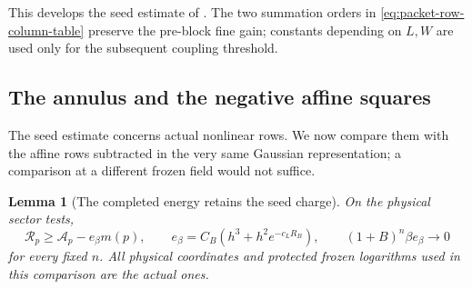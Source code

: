 \documentclass[11pt,reqno]{amsart}
\numberwithin{equation}{section}
\newtheorem{lemma}[theorem]{Lemma}
\theoremstyle{definition}
\theoremstyle{remark}
\begin{document}
This develops the seed estimate of
\cite[Lemma~30.6, pp.~173--181]{Main}. The two summation orders
in \eqref{eq:packet-row-column-table} preserve the pre-block
fine gain; constants depending on \(L,W\) are used only for
the subsequent coupling threshold.


\subsection{The annulus and the negative affine squares}

The seed estimate concerns actual nonlinear rows. We now compare
them with the affine rows subtracted in the very same Gaussian
representation; a comparison at a different frozen field would
not suffice.

\begin{lemma}[The completed energy retains the seed charge]
\label{lem:packet-annulus-comparison}
On the physical sector tests,
\begin{equation}
 \mathcal R_p\ge\mathcal A_p-e_\beta m(p),\qquad
 e_\beta=C_B(h^3+h^2e^{-c_LR_B}),\qquad
                      (1+B)^n\beta e_\beta\longrightarrow0
 \label{eq:packet-annulus-comparison}
\end{equation}
for every fixed \(n\). All physical coordinates and protected
frozen logarithms used in this comparison are the actual ones.
\end{lemma}
\end{document}
